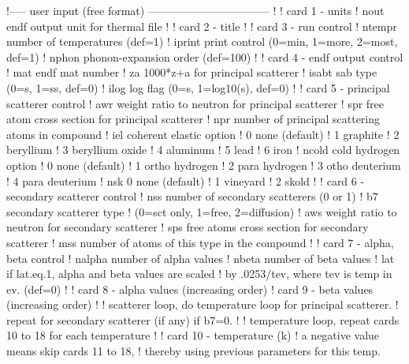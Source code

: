 \small
\begin{ccode}

   !----- user input (free format) ---------------------------------
   !
   ! card 1 - units
   !    nout     endf output unit for thermal file
   !
   ! card 2 - title
   !
   ! card 3 - run control
   !    ntempr  number of temperatures (def=1)
   !    iprint  print control (0=min, 1=more, 2=most, def=1)
   !    nphon   phonon-expansion order (def=100)
   !
   ! card 4 - endf output control
   !    mat     endf mat number
   !    za      1000*z+a for principal scatterer
   !    isabt   sab type (0=s, 1=ss, def=0)
   !    ilog    log flag (0=s, 1=log10(s), def=0)
   !
   ! card 5 - principal scatterer control
   !    awr     weight ratio to neutron for principal scatterer
   !    spr     free atom cross section for principal scatterer
   !    npr     number of principal scattering atoms in compound
   !    iel     coherent elastic option
   !                   0  none (default)
   !                   1  graphite
   !                   2  beryllium
   !                   3  beryllium oxide
   !                   4  aluminum
   !                   5  lead
   !                   6  iron
   !    ncold   cold hydrogen option
   !                   0   none (default)
   !                   1   ortho hydrogen
   !                   2   para hydrogen
   !                   3   otho deuterium
   !                   4   para deuterium
   !    nsk            0   none (default)
   !                   1   vineyard
   !                   2   skold
   !
   ! card 6 - secondary scatterer control
   !    nss     number of secondary scatterers (0 or 1)
   !    b7      secondary scatterer type
   !             (0=sct only, 1=free, 2=diffusion)
   !    aws     weight ratio to neutron for secondary scatterer
   !    sps     free atoms cross section for secondary scatterer
   !    mss     number of atoms of this type in the compound
   !
   ! card 7 - alpha, beta control
   !    nalpha   number of alpha values
   !    nbeta    number of beta values
   !    lat      if lat.eq.1, alpha and beta values are scaled
   !               by .0253/tev, where tev is temp in ev.  (def=0)
   !
   ! card 8 - alpha values (increasing order)
   ! card 9 - beta values (increasing order)
   !
   ! scatterer loop, do temperature loop for principal scatterer.
   !         repeat for secondary scatterer (if any) if b7=0.
   !
   ! temperature loop, repeat cards 10 to 18 for each temperature
   !
   !    card 10 - temperature (k)
   !       a negative value means skip cards 11 to 18,
   !          thereby using previous parameters for this temp.

\end{ccode}
